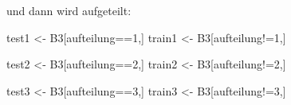\documentclass[12pt,]{book}
\makeatletter
\newenvironment{Shaded}{\begin{snugshade}}{\end{snugshade}}
\newcommand{\DecValTok}[1]{\textcolor[rgb]{0.00,0.00,0.81}{{#1}}}
\newcommand{\StringTok}[1]{\textcolor[rgb]{0.31,0.60,0.02}{{#1}}}
\newcommand{\NormalTok}[1]{{#1}}
\newenvironment{kframe}{%
\medskip{}
\setlength{\fboxsep}{.8em}
 \def\at@end@of@kframe{}%
 \ifinner\ifhmode%
  \def\at@end@of@kframe{\end{minipage}}%
  \begin{minipage}{\columnwidth}%
 \fi\fi%
 \def\FrameCommand##1{\hskip\@totalleftmargin \hskip-\fboxsep
 \colorbox{shadecolor}{##1}\hskip-\fboxsep
     \hskip-\linewidth \hskip-\@totalleftmargin \hskip\columnwidth}%
 \MakeFramed {\advance\hsize-\width
   \@totalleftmargin\z@ \linewidth\hsize
   \@setminipage}}%
 {\par\unskip\endMakeFramed%
 \at@end@of@kframe}
\renewenvironment{Shaded}{\begin{kframe}}{\end{kframe}}
\makeatother
\begin{document}
und dann wird aufgeteilt:

\begin{Shaded}
\begin{Highlighting}[]
\NormalTok{test1 <-}\StringTok{ }\NormalTok{B3[aufteilung==}\DecValTok{1}\NormalTok{,]}
\NormalTok{train1 <-}\StringTok{ }\NormalTok{B3[aufteilung!=}\DecValTok{1}\NormalTok{,]}

\NormalTok{test2 <-}\StringTok{ }\NormalTok{B3[aufteilung==}\DecValTok{2}\NormalTok{,]}
\NormalTok{train2 <-}\StringTok{ }\NormalTok{B3[aufteilung!=}\DecValTok{2}\NormalTok{,]}

\NormalTok{test3 <-}\StringTok{ }\NormalTok{B3[aufteilung==}\DecValTok{3}\NormalTok{,]}
\NormalTok{train3 <-}\StringTok{ }\NormalTok{B3[aufteilung!=}\DecValTok{3}\NormalTok{,]}
\end{Highlighting}
\end{Shaded}
\end{document}

